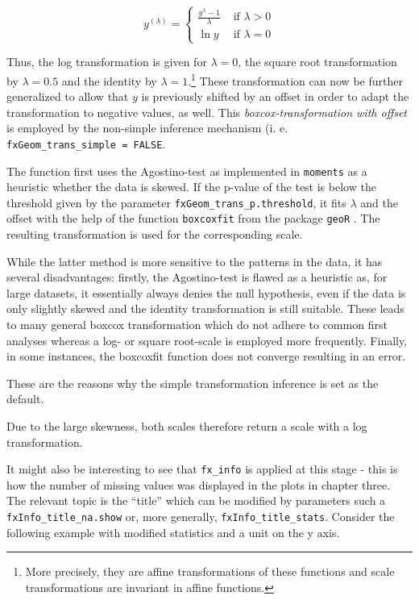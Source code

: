 \documentclass[]{report}
\let\rmarkdownfootnote\footnote%
\def\footnote{\protect\rmarkdownfootnote}
\theoremstyle{definition}
\theoremstyle{definition}
\theoremstyle{definition}
\theoremstyle{remark}
\begin{document}
\[y^{(\lambda)}=\begin{cases}\frac{y^{\lambda}-1}{\lambda}&\text{ if }\lambda > 0\\\ln y&\text{ if }\lambda = 0\end{cases}\]

Thus, the log transformation is given for \(\lambda=0\), the square root
transformation by \(\lambda =0.5\) and the identity by
\(\lambda=1\).\footnote{More precisely, they are affine transformations
  of these functions and scale transformations are invariant in affine
  functions.} These transformation can now be further generalized to
allow that \(y\) is previously shifted by an offset in order to adapt
the transformation to negative values, as well. This
\emph{boxcox-transformation with offset} is employed by the non-simple
inference mechanism (i. e. \texttt{fxGeom\_trans\_simple\ =\ FALSE}.

The function first uses the Agostino-test as implemented in
\texttt{moments} as a heuristic whether the data is skewed. If the
p-value of the test is below the threshold given by the parameter
\texttt{fxGeom\_trans\_p.threshold}, it fits \(\lambda\) and the offset
with the help of the function \texttt{boxcoxfit} from the package
\texttt{geoR} \citep{geoR}. The resulting transformation is used for the
corresponding scale.

While the latter method is more sensitive to the patterns in the data,
it has several disadvantages: firstly, the Agostino-test is flawed as a
heuristic as, for large datasets, it essentially always denies the null
hypothesis, even if the data is only slightly skewed and the identity
transformation is still suitable. These leads to many general boxcox
transformation which do not adhere to common first analyses whereas a
log- or square root-scale is employed more frequently. Finally, in some
instances, the boxcoxfit function does not converge resulting in an
error.

These are the reasons why the simple transformation inference is set as
the default.

Due to the large skewness, both scales therefore return a scale with a
log transformation.

It might also be interesting to see that \texttt{fx\_info} is applied at
this stage - this is how the number of missing values was displayed in
the plots in chapter three. The relevant topic is the ``title'' which
can be modified by parameters such a \texttt{fxInfo\_title\_na.show} or,
more generally, \texttt{fxInfo\_title\_stats}. Consider the following
example with modified statistics and a unit on the y axis.
\end{document}
